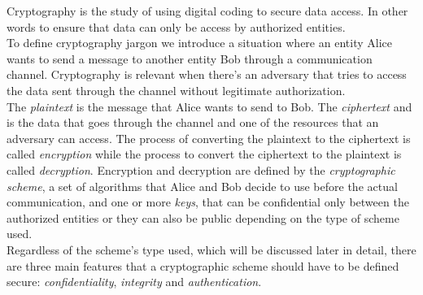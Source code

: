 Cryptography is the study of using digital coding to secure data access. In other words to ensure that data can only be access by authorized entities.\\
To define cryptography jargon we introduce a situation where an entity Alice wants to send a message to another entity Bob through a communication channel. Cryptography is relevant when there's an adversary that tries to access the data sent through the channel without legitimate authorization.\\
The \emph{plaintext} is the message that Alice wants to send to Bob. The \emph{ciphertext} and is the data that goes through the channel and one of the resources that an adversary can access.
The process of converting the plaintext to the ciphertext is called \emph{encryption} while the process to convert the ciphertext to the plaintext is called \emph{decryption}.
Encryption and decryption are defined by the \emph{cryptographic scheme}, a set of algorithms that Alice and Bob decide to use before the actual communication, and one or more \emph{keys}, that can be confidential only between the authorized entities or they can also be public depending on the type of scheme used.\\
Regardless of the scheme's type used, which will be discussed later in detail, there are three main features that a cryptographic scheme should have to be defined secure: \emph{confidentiality}, \emph{integrity} and \emph{authentication}.
